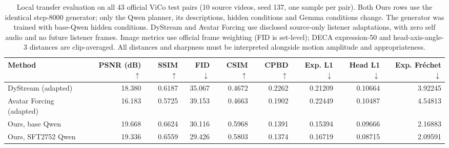 \begin{table}[t]
\centering\small
\caption{Local transfer evaluation on all 43 official ViCo test pairs (10 source videos, seed 137, one sample per pair). Both Ours rows use the identical step-8000 generator; only the Qwen planner, its descriptions, hidden conditions and Gemma conditions change. The generator was trained with base-Qwen hidden conditions. DyStream and Avatar Forcing use disclosed source-only listener adaptations, with zero self audio and no future listener frames. Image metrics use official frame weighting (FID is set-level); DECA expression-50 and head-axis-angle-3 distances are clip-averaged. All distances and sharpness must be interpreted alongside motion amplitude and appropriateness.}
\label{tab:vico43-planner}
\setlength{\tabcolsep}{4pt}
\begin{tabular}{lrrrrrrrr}
\toprule
Method & PSNR (dB) $\uparrow$ & SSIM $\uparrow$ & FID $\downarrow$ & CSIM $\uparrow$ & CPBD $\uparrow$ & Exp. L1 $\downarrow$ & Head L1 $\downarrow$ & Exp. Fr\'{e}chet $\downarrow$ \\
\midrule
DyStream (adapted) & 18.380 & 0.6187 & 35.067 & 0.4672 & 0.2262 & 0.21209 & 0.10664 & 3.92245 \\
Avatar Forcing (adapted) & 16.183 & 0.5725 & 39.153 & 0.4663 & 0.1902 & 0.22449 & 0.10487 & 4.54813 \\
Ours, base Qwen & 19.668 & 0.6624 & 30.116 & 0.5968 & 0.1391 & 0.15394 & 0.09666 & 2.16883 \\
Ours, SFT2752 Qwen & 19.336 & 0.6559 & 29.426 & 0.5803 & 0.1374 & 0.16719 & 0.08715 & 2.09591 \\
\bottomrule
\end{tabular}
\end{table}
